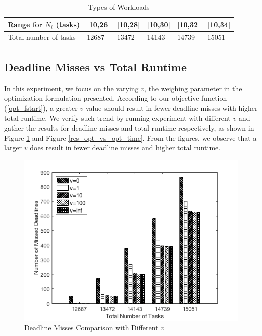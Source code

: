 \begin{table}[h]
\caption{Types of Workloads}
\small
\centering
\begin{tabular}{|m{1cm}|m{1cm}|m{1cm}|m{1cm}|m{1cm}|m{1cm}|}
    \hline
    Range for $N_{i}$ (tasks)& [10,26] & [10,28] & [10,30] & [10,32] & [10,34] \\ \hline
    Total number of tasks & 12687 & 13472 & 14143 & 14739 & 15051 \\ \hline
\end{tabular}
\label{ntypes}
\end{table}

\subsection{Deadline Misses vs Total Runtime}

In this experiment, we focus on the varying $v$, the weighing parameter in the optimization formulation presented. According to our objective function (\ref{opt_fstart}), a greater $v$ value should result in fewer deadline misses with higher total runtime. We verify such trend by running experiment with different $v$ and gather the results for deadline misses and total runtime respectively, as shown in Figure \ref{res_opt_vs_opt_md} and Figure \ref{res_opt_vs_opt_time}. From the figures, we observe that a larger $v$ does result in fewer deadline misses and higher total runtime.


\begin{figure}[h!]
\centering
\includegraphics[width=1\linewidth]{images/res_opt_vs_opt_mdp}
\caption{Deadline Misses Comparison with Different $v$ }
\label{res_opt_vs_opt_md}
\end{figure}


